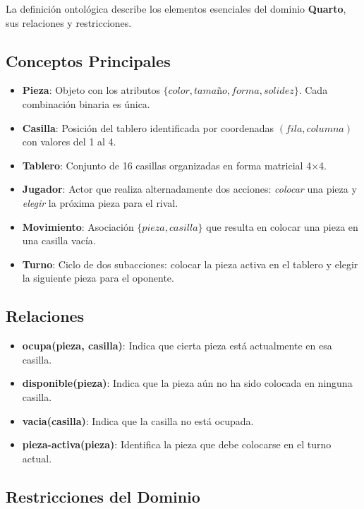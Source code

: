 \documentclass[conference]{IEEEtran}
\begin{document}
La definición ontológica describe los elementos esenciales del dominio \textbf{Quarto}, sus relaciones y restricciones.

\subsection{Conceptos Principales}

\begin{itemize}
\item \textbf{Pieza}: Objeto con los atributos $\{color, tamaño, forma, solidez\}$. Cada combinación binaria es única.
\item \textbf{Casilla}: Posición del tablero identificada por coordenadas $(fila, columna)$ con valores del 1 al 4.
\item \textbf{Tablero}: Conjunto de 16 casillas organizadas en forma matricial 4×4.
\item \textbf{Jugador}: Actor que realiza alternadamente dos acciones: \textit{colocar} una pieza y \textit{elegir} la próxima pieza para el rival.
\item \textbf{Movimiento}: Asociación $\{pieza, casilla\}$ que resulta en colocar una pieza en una casilla vacía.
\item \textbf{Turno}: Ciclo de dos subacciones: colocar la pieza activa en el tablero y elegir la siguiente pieza para el oponente.
\end{itemize}

\subsection{Relaciones}

\begin{itemize}
\item \textbf{ocupa(pieza, casilla)}: Indica que cierta pieza está actualmente en esa casilla.
\item \textbf{disponible(pieza)}: Indica que la pieza aún no ha sido colocada en ninguna casilla.
\item \textbf{vacia(casilla)}: Indica que la casilla no está ocupada.
\item \textbf{pieza-activa(pieza)}: Identifica la pieza que debe colocarse en el turno actual.
\end{itemize}

\subsection{Restricciones del Dominio}
\end{document}
